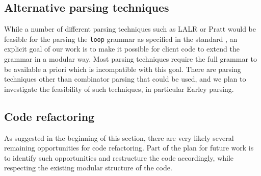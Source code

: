 \subsection{Alternative parsing techniques}

While a number of different parsing techniques such as LALR
\cite{DeRemer:lalr} or Pratt \cite{Pratt:1973:TDO:512927.512931} would
be feasible for the parsing the \texttt{loop} grammar as specified in
the standard , an explicit goal of our work is to
make it possible for client code to extend the grammar in a modular
way.  Most parsing techniques require the full grammar to be available
a priori which is incompatible with this goal.  There are parsing
techniques other than combinator parsing that could be used, and we
plan to investigate the feasibility of such techniques, in particular
Earley \cite{Earley:1970:ECP:362007.362035} parsing.

\subsection{Code refactoring}

As suggested in the beginning of this section, there are very likely
several remaining opportunities for code refactoring.  Part of the
plan for future work is to identify such opportunities and restructure
the code accordingly, while respecting the existing modular structure
of the code.
